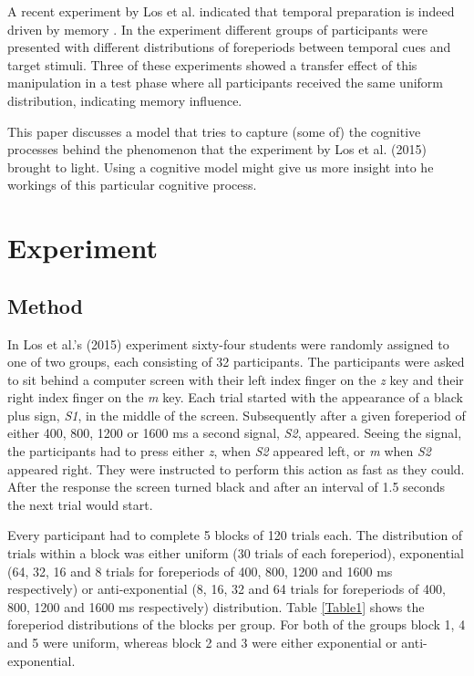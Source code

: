 \documentclass[10pt,letterpaper]{article}
\begin{document}
A recent experiment by Los et al. indicated that temporal preparation is indeed driven by memory \cite{Los2}. In the experiment different groups of participants were presented with different distributions of foreperiods between temporal cues and target stimuli. Three of these experiments showed a transfer effect of this manipulation in a test phase where all participants received the same uniform distribution, indicating memory influence. 

This paper discusses a model that tries to capture (some of) the cognitive processes behind the phenomenon that the experiment by Los et al. (2015) brought to light. Using a cognitive model might give us more insight into he workings of this particular cognitive process.

\section{Experiment}
\subsection{Method}
In Los et al.'s (2015) experiment sixty-four students were randomly assigned to one of two groups, each consisting of 32 participants. The participants were asked to sit behind a computer screen with their left index finger on the \textit{z} key and their right index finger on the \textit{m} key. Each trial started with the appearance of a black plus sign, \textit{S1}, in the middle of the screen. Subsequently after a given foreperiod of either 400, 800, 1200 or 1600 ms a second signal, \textit{S2}, appeared. Seeing the signal, the participants had to press either \textit{z}, when \textit{S2} appeared left, or \textit{m} when \textit{S2} appeared right. They were instructed to perform this action as fast as they could. After the response the screen turned black and after an interval of 1.5 seconds the next trial would start.

Every participant had to complete 5 blocks of 120 trials each. The distribution of trials within a block was either uniform (30 trials of each foreperiod), exponential (64, 32, 16 and 8 trials for foreperiods of 400, 800, 1200 and 1600 ms respectively) or anti-exponential (8, 16, 32 and 64 trials for foreperiods of 400, 800, 1200 and 1600 ms respectively) distribution. Table \ref{Table1} shows the foreperiod distributions of the blocks per group. For both of the groups block 1, 4 and 5 were uniform, whereas block 2 and 3 were either exponential or anti-exponential.
\end{document}
